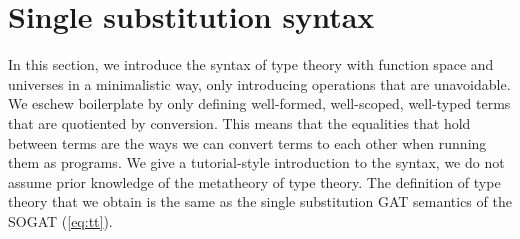 \documentclass[sigplan,10pt,anonymous,review]{acmart}\settopmatter{printfolios=true,printccs=false,printacmref=false}
\begin{document}
\section{Single substitution syntax}
\label{sec:tt}

In this section, we introduce the syntax of type theory with function
space and universes in a minimalistic way, only introducing operations
that are unavoidable. We eschew boilerplate by only defining
well-formed, well-scoped, well-typed terms that are quotiented by
conversion. This means that the equalities that hold between terms are
the ways we can convert terms to each other when running them as
programs. We give a tutorial-style introduction to the syntax, we do
not assume prior knowledge of the metatheory of type theory. The
definition of type theory that we obtain is the same as the single
substitution GAT semantics \cite{DBLP:conf/fscd/KaposiX24} of the
SOGAT (\ref{eq:tt}).
\end{document}
